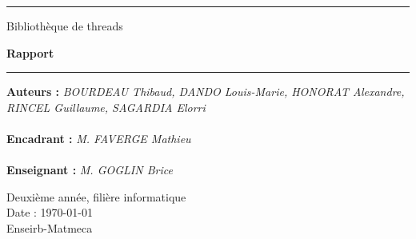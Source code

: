 \thispagestyle{empty}

\hrule
\begin{flushleft}
\Huge{Bibliothèque de threads}\\
\end{flushleft}
\begin{flushright}
\huge\textbf{Rapport}\\
\end{flushright}
\hrule

\noindent\textbf{Auteurs :}
\emph{BOURDEAU Thibaud, DANDO Louis-Marie, HONORAT Alexandre, RINCEL Guillaume, SAGARDIA Elorri}\\
\\
\noindent\textbf{Encadrant :}
\emph{M. FAVERGE Mathieu}\\
\\
\noindent\textbf{Enseignant :}
\emph{M. GOGLIN Brice} 

\normalsize
\begin{center}
  Deuxième année, filière informatique\\
  Date : \today\\
  Enseirb-Matmeca
\end{center}
